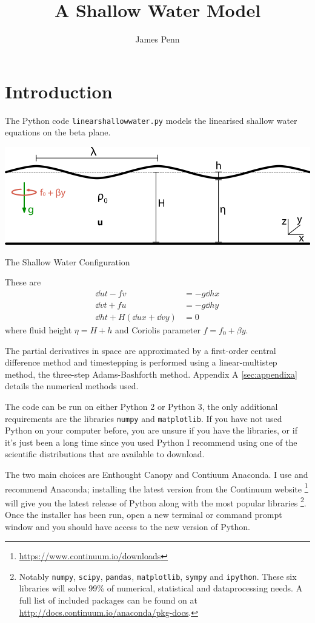 \documentclass[a4paper]{tufte-handout}
\author{James Penn}
\title{A Shallow Water Model}
\begin{document}
  \section{Introduction}
  \label{sec:Introduction}
  The Python code \texttt{linearshallowwater.py} models the linearised shallow
  water equations on the beta plane.
  \begin{marginfigure}[1in]
    \includegraphics{shallow_water}
    \caption{The Shallow Water Configuration}
    \label{fig:shallow}
  \end{marginfigure}
  These are
  \begin{align}
    \dd{u}{t} - fv &= - g \dd{h}{x} \\
    \dd{v}{t} + fu &= - g \dd{h}{y} \\
    \dd{h}{t} + H(\dd{u}{x} + \dd{v}{y}) &= 0
  \end{align}
  where fluid height $\eta = H + h$ and Coriolis parameter $f=f_0 + \beta y$.

  The partial derivatives in space are approximated by a first-order central
  difference method and timestepping is performed using a linear-multistep method,
  the three-step Adams-Bashforth method.
  Appendix A \ref{sec:appendixa} details the numerical methods used.

  The code can be run on either Python 2 or Python 3, the only additional requirements are the libraries \texttt{numpy} and \texttt{matplotlib}.
  If you have not used Python on your computer before, you are unsure if you have the libraries, or if it's just been a long time since you used Python I recommend using one of the scientific distributions that are available to download.

  The two main choices are Enthought Canopy and Contiuum Anaconda.
  I use and recommend Anaconda; installing the latest version from the Continuum website \footnote{\url{https://www.continuum.io/downloads}} will give you the latest release of Python along with the most popular libraries \footnote{Notably \texttt{numpy}, \texttt{scipy}, \texttt{pandas}, \texttt{matplotlib}, \texttt{sympy} and \texttt{ipython}.  These six libraries will solve 99\% of numerical, statistical and dataprocessing needs.
  A full list of included packages can be found on at \url{http://docs.continuum.io/anaconda/pkg-docs}.}.
  Once the installer has been run, open a new terminal or command prompt window and you should have access to the new version of Python.
\end{document}
